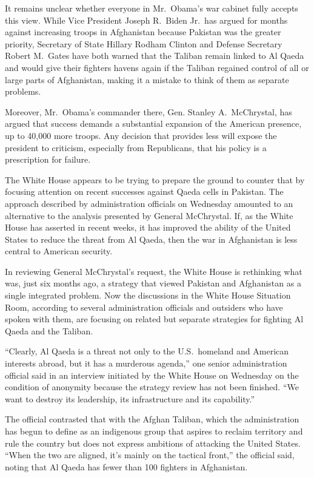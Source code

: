 ﻿\documentclass[12pt]{article}
\begin{document}
It remains unclear whether everyone in Mr.~Obama's war cabinet fully accepts this view. While Vice
President Joseph R.~Biden Jr.~has argued for months against increasing troops in Afghanistan because
Pakistan was the greater priority, Secretary of State Hillary Rodham Clinton and Defense Secretary
Robert M.~Gates have both warned that the Taliban remain linked to Al Qaeda and would give their
fighters havens again if the Taliban regained control of all or large parts of Afghanistan, making
it a mistake to think of them as separate problems.

Moreover, Mr.~Obama's commander there, Gen. Stanley A.~McChrystal, has argued that success demands a
substantial expansion of the American presence, up to 40,000 more troops. Any decision that provides
less will expose the president to criticism, especially from Republicans, that his policy is a
prescription for failure.

The White House appears to be trying to prepare the ground to counter that by focusing attention on
recent successes against Qaeda cells in Pakistan. The approach described by administration officials
on Wednesday amounted to an alternative to the analysis presented by General McChrystal. If, as the
White House has asserted in recent weeks, it has improved the ability of the United States to reduce
the threat from Al Qaeda, then the war in Afghanistan is less central to American security.

In reviewing General McChrystal's request, the White House is rethinking what was, just six months
ago, a strategy that viewed Pakistan and Afghanistan as a single integrated problem. Now the
discussions in the White House Situation Room, according to several administration officials and
outsiders who have spoken with them, are focusing on related but separate strategies for fighting Al
Qaeda and the Taliban.

``Clearly, Al Qaeda is a threat not only to the U.S.~homeland and American interests abroad, but it
has a murderous agenda,'' one senior administration official said in an interview initiated by the
White House on Wednesday on the condition of anonymity because the strategy review has not been
finished. ``We want to destroy its leadership, its infrastructure and its capability.''

The official contrasted that with the Afghan Taliban, which the administration has begun to define
as an indigenous group that aspires to reclaim territory and rule the country but does not express
ambitions of attacking the United States. ``When the two are aligned, it's mainly on the tactical
front,'' the official said, noting that Al Qaeda has fewer than 100 fighters in Afghanistan.
\end{document}
